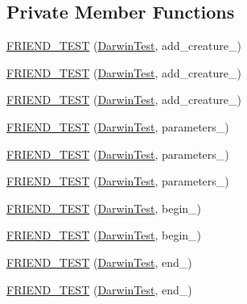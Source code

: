 \subsection*{Private Member Functions}
\begin{DoxyCompactItemize}
\item 
\hyperlink{classDarwin_a3254740d04b1f2b5f67bbc1f7a54a6ea}{F\-R\-I\-E\-N\-D\-\_\-\-T\-E\-S\-T} (\hyperlink{classDarwin_a9e02add6ec6cd0cafdde4b8fdd0cde3a}{Darwin\-Test}, add\-\_\-creature\-\_)
\item 
\hyperlink{classDarwin_ad9f1f78b39b1b4266afb717c1668940c}{F\-R\-I\-E\-N\-D\-\_\-\-T\-E\-S\-T} (\hyperlink{classDarwin_a9e02add6ec6cd0cafdde4b8fdd0cde3a}{Darwin\-Test}, add\-\_\-creature\-\_)
\item 
\hyperlink{classDarwin_a53fb1b6a15187967a8eb326713204581}{F\-R\-I\-E\-N\-D\-\_\-\-T\-E\-S\-T} (\hyperlink{classDarwin_a9e02add6ec6cd0cafdde4b8fdd0cde3a}{Darwin\-Test}, add\-\_\-creature\-\_)
\item 
\hyperlink{classDarwin_aa0c4fb0e6ea27a34a16e6af1e26e2b92}{F\-R\-I\-E\-N\-D\-\_\-\-T\-E\-S\-T} (\hyperlink{classDarwin_a9e02add6ec6cd0cafdde4b8fdd0cde3a}{Darwin\-Test}, parameters\-\_)
\item 
\hyperlink{classDarwin_a4e43b6979ed6b3175c745ca695509a55}{F\-R\-I\-E\-N\-D\-\_\-\-T\-E\-S\-T} (\hyperlink{classDarwin_a9e02add6ec6cd0cafdde4b8fdd0cde3a}{Darwin\-Test}, parameters\-\_)
\item 
\hyperlink{classDarwin_a028cfb3dd1e502ec5c305098691f25cb}{F\-R\-I\-E\-N\-D\-\_\-\-T\-E\-S\-T} (\hyperlink{classDarwin_a9e02add6ec6cd0cafdde4b8fdd0cde3a}{Darwin\-Test}, parameters\-\_)
\item 
\hyperlink{classDarwin_ac63a2857e83e06cdc5a7efcbfb6f7314}{F\-R\-I\-E\-N\-D\-\_\-\-T\-E\-S\-T} (\hyperlink{classDarwin_a9e02add6ec6cd0cafdde4b8fdd0cde3a}{Darwin\-Test}, begin\-\_)
\item 
\hyperlink{classDarwin_a945b09b2dc48e575abd6fdf543b1d7a7}{F\-R\-I\-E\-N\-D\-\_\-\-T\-E\-S\-T} (\hyperlink{classDarwin_a9e02add6ec6cd0cafdde4b8fdd0cde3a}{Darwin\-Test}, begin\-\_)
\item 
\hyperlink{classDarwin_adc457d11caf47c567c9548797da6ba0f}{F\-R\-I\-E\-N\-D\-\_\-\-T\-E\-S\-T} (\hyperlink{classDarwin_a9e02add6ec6cd0cafdde4b8fdd0cde3a}{Darwin\-Test}, end\-\_)
\item 
\hyperlink{classDarwin_a7c60555f03350b2510970a781e55fa82}{F\-R\-I\-E\-N\-D\-\_\-\-T\-E\-S\-T} (\hyperlink{classDarwin_a9e02add6ec6cd0cafdde4b8fdd0cde3a}{Darwin\-Test}, end\-\_)

\end{DoxyCompactItemize}
